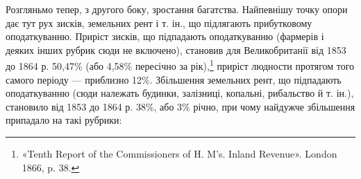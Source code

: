 Розгляньмо тепер, з другого боку, зростання багатства. Найпевнішу
точку опори дає тут рух зисків, земельних рент і т. ін.,
що підлягають прибутковому оподаткуванню. Приріст зисків, що
підпадають оподаткуванню (фармерів і деяких інших рубрик сюди
не включено), становив для Великобританії від 1853 до 1864 р.
50,47\% (або 4,58\% пересічно за рік),\footnote{
«Tenth Report of the Commissioners of H. M’s. Inland Revenue».
London 1866, p. 38.
} приріст людности протягом
того самого періоду — приблизно 12\%. Збільшення земельних
рент, що підпадають оподаткуванню (сюди належать
будинки, залізниці, копальні, рибальство й т. ін.), становило
від 1853 до 1864 р. 38\%, або 3\% річно, при чому найдужче
збільшення припадало на такі рубрики:
